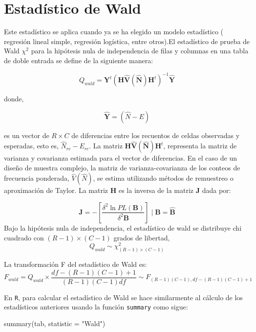 \documentclass[
  12pt,
]{book}
\newenvironment{Shaded}{\begin{snugshade}}{\end{snugshade}}
\newcommand{\AttributeTok}[1]{\textcolor[rgb]{0.77,0.63,0.00}{#1}}
\newcommand{\FunctionTok}[1]{\textcolor[rgb]{0.00,0.00,0.00}{#1}}
\newcommand{\NormalTok}[1]{#1}
\newcommand{\StringTok}[1]{\textcolor[rgb]{0.31,0.60,0.02}{#1}}
\begin{document}
\hypertarget{estaduxedstico-de-wald}{%
\section{Estadístico de Wald}\label{estaduxedstico-de-wald}}

Este estadístico se aplica cuando ya se ha elegido un modelo estadístico ( regresión lineal simple, regresión logística, entre otros).El estadístico de prueba de Wald \(\chi^{2}\) para la hipótesis nula de independencia de filas y columnas en una tabla de doble entrada se define de la siguiente manera:

\[
Q_{wald}=\hat{\boldsymbol{Y}^{t}}\left(\boldsymbol{H}\hat{\boldsymbol{V}}\left(\hat{\boldsymbol{N}}\right)\boldsymbol{H}^{t}\right)^{-1}\hat{\boldsymbol{Y}}
\]

donde,

\[
\hat{\boldsymbol{Y}}=\left(\hat{N}-E\right)
\]

es un vector de \(R\times C\) de diferencias entre los recuentos de celdas observadas y esperadas, esto es, \(\hat{N}_{rc}-E_{rc}\). La matriz \(\boldsymbol{H}\hat{\boldsymbol{V}}\left(\hat{\boldsymbol{N}}\right)\boldsymbol{H}^{t}\), representa la matriz de varianza y covarianza estimada para el vector de diferencias. En el caso de un diseño de muestra complejo, la matriz de varianza-covarianza de los conteos de frecuencia ponderada, \(\hat{V}\left(\hat{N}\right)\), se estima utilizando métodos de remuestreo o aproximación de Taylor. La matriz \(\boldsymbol{H}\) es la inversa de la matriz \(\boldsymbol{J}\) dada por:

\[
\boldsymbol{J}=-\left[\frac{\delta^{2}\ln PL\left(\boldsymbol{B}\right)}{\delta^{2}\boldsymbol{B}}\right] \mid \boldsymbol{B}=\hat{\boldsymbol{B}}
\]
Bajo la hipótesis nula de independencia, el estadístico de wald se distribuye chi cuadrado con \(\left(R-1\right)\times\left(C-1\right)\) grados de libertad,
\[
Q_{wald}\sim\chi_{\left(R-1\right)\times\left(C-1\right)}^{2}
\]

La transformación F del estadístico de Wald es:
\[
F_{wald}=Q_{wald}\times\frac{df-\left(R-1\right)\left(C-1\right)+1}{\left(R-1\right)\left(C-1\right)df}\sim F_{\left(R-1\right)\left(C-1\right),df-\left(R-1\right)\left(C-1\right)+1}
\]

En \texttt{R}, para calcular el estadístico de Wald se hace similarmente al cálculo de los estadísticos anteriores usando la función \texttt{summary} como sigue:

\begin{Shaded}
\begin{Highlighting}[]
\FunctionTok{summary}\NormalTok{(tab, }\AttributeTok{statistic =} \StringTok{"Wald"}\NormalTok{)}
\end{Highlighting}
\end{Shaded}
\end{document}
